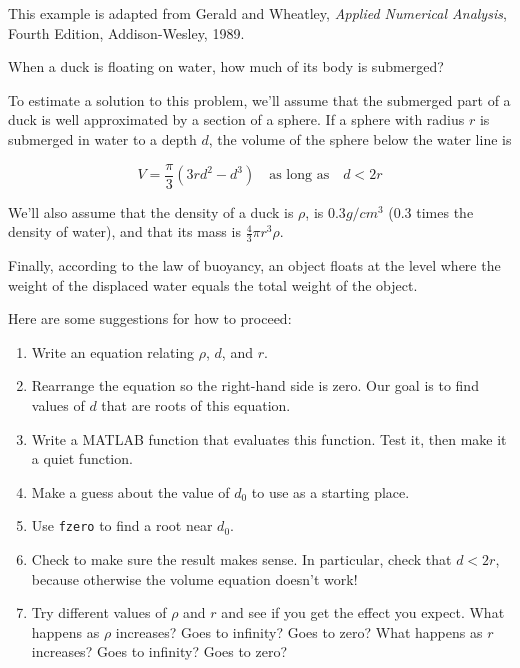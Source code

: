 \begin{ex}
\label{duck}

This example is adapted from Gerald and Wheatley,
{\em Applied Numerical Analysis}, Fourth Edition, Addison-Wesley,
1989. 

When a duck is floating on water, how much of its body is submerged?


To estimate a solution to this problem, we'll assume that the submerged part of a duck is well approximated by a section of a sphere.
If a sphere with radius $r$ is submerged in water to a depth $d$, the
volume of the sphere below the water line is

\[ V = \frac{\pi}{3} (3r d^2 - d^3) \quad
\mbox{as long as} \quad d < 2 r  \]

We'll also assume that the density of a duck is $\rho$, is $0.3 g / cm^3$ (0.3 times the density of water), and that its mass is $\frac{4}{3} \pi r^3 \rho$.

Finally, according to the law of buoyancy, an object floats at the level where the weight of the displaced water equals the total weight of the object.


Here are some suggestions for how to proceed:

\begin{enumerate}

\item Write an equation relating $\rho$, $d$, and $r$.

\item Rearrange the equation so the right-hand side is zero.
Our goal is to find values of $d$ that are roots of this equation.

\item Write a MATLAB function that evaluates this function.  Test it,
   then make it a quiet function.

\item Make a guess about the value of $d_0$ to use as a starting place.

\item Use {\tt fzero} to find a root near $d_0$.

\item Check to make sure the result makes sense.  In particular,
   check that $d < 2 r$, because otherwise the volume equation
   doesn't work!

\item Try different values of $\rho$ and $r$ and see if you get the
  effect you expect.  What happens as $\rho$ increases?  Goes to
  infinity?  Goes to zero?  What happens as $r$ increases?  Goes to
  infinity?  Goes to zero?

\end{enumerate}

\end{ex}

